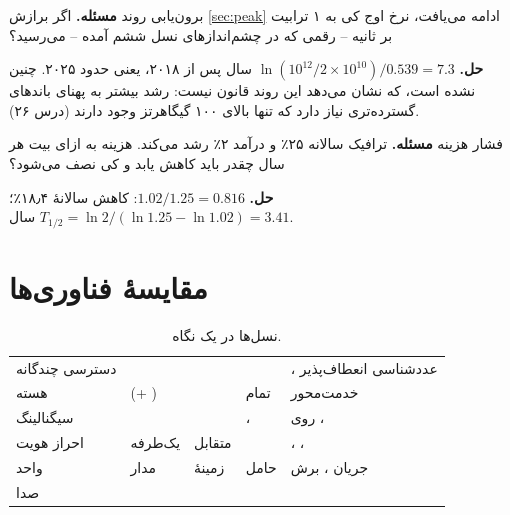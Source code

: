 \documentclass[11pt,a4paper]{article}
\begin{document}
\begin{examplebox}{برون‌یابی روند}\label{ex:extra}
\textbf{مسئله.} اگر برازش \cref{sec:peak} ادامه می‌یافت، نرخ اوج کی به ۱ ترابیت بر ثانیه -- رقمی که در چشم‌اندازهای نسل ششم آمده \cite{saad2020vision} -- می‌رسید؟

\textbf{حل.} $\ln(10^{12}/2\times10^{10})/0.539 = 7.3$ سال پس از ۲۰۱۸، یعنی حدود ۲۰۲۵. چنین نشده است، که نشان می‌دهد این روند قانون نیست: رشد بیشتر به پهنای
باندهای گسترده‌تری نیاز دارد که تنها بالای ۱۰۰ گیگاهرتز وجود دارند (درس ۲۶).
\end{examplebox}

\begin{examplebox}{فشار هزینه}\label{ex:cost}
\textbf{مسئله.} ترافیک سالانه ۲۵٪ و درآمد ۲٪ رشد می‌کند. هزینه به ازای بیت هر سال چقدر باید کاهش یابد و کی نصف می‌شود؟

\textbf{حل.} $1.02/1.25 = 0.816$: کاهش سالانهٔ ۱۸٫۴٪؛ $T_{1/2} = \ln 2/(\ln 1.25 - \ln 1.02) = 3.41$ سال.
\end{examplebox}

\section{مقایسهٔ فناوری‌ها}
\begin{table}[htbp]
\centering\small
\caption{نسل‌ها در یک نگاه.}\label{tab:cmp}
\begin{tabularx}{\linewidth}{@{}l Y Y Y Y@{}}
\toprule
{} &  &  &  &  \\
\midrule
دسترسی چندگانه &  &  &  & ، عددشناسی انعطاف‌پذیر \\
هسته &  (+ ) &  &  تمام‌ &  خدمت‌محور \\
سیگنالینگ &  &  & ،  &  روی ،  \\
احراز هویت & یک‌طرفه &  متقابل &  & ، ،  \\
واحد  & مدار & زمینهٔ  & حامل  & جریان ، برش \\
صدا &  &  &  &  \\
\bottomrule
\end{tabularx}
\end{table}
\end{document}
